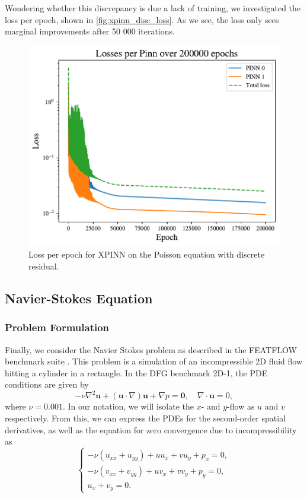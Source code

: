 Wondering whether this discrepancy is due a lack of training, we investigated the loss per epoch, shown in \autoref{fig:xpinn_disc_loss}.
As we see, the loss only sees marginal improvements after 50 000 iterations.

\begin{figure}
    \centering
    \includegraphics[width=0.9\linewidth]{Project1XPINNs/figures/Poisson/discrete_xpinn_Poisson_losses.pdf}
    \caption{Loss per epoch for XPINN on the Poisson equation with discrete residual.}
    \label{fig:xpinn_disc_loss}
\end{figure}

\subsection{Navier-Stokes Equation}
\subsubsection{Problem Formulation}
Finally, we consider the Navier Stokes problem as described in the FEATFLOW benchmark suite \cite{DFG}. This problem is a simulation of an incompressible 2D fluid flow hitting a cylinder in a rectangle. In the DFG benchmark 2D-1, the PDE conditions are given by
\begin{equation}
    -\nu \nabla^2 \mathbf{u} + (\mathbf{u} \cdot \nabla)\mathbf{u} + \nabla p = \mathbf{0}, \quad \nabla \cdot \mathbf{u} = 0,
\end{equation}
where $\nu = 0.001$. In our notation, we will isolate the $x$- and $y$-flow as $u$ and $v$ respectively. From this, we can express the PDEs for the second-order spatial derivatives, as well as the equation for zero convergence due to incompressibility as
\begin{equation}
\begin{cases}
-\nu(u_{xx} + u_{yy})+uu_x+vu_y+p_x = 0, \\
-\nu(v_{xx} + v_{yy})+uv_x+vv_y+p_y = 0, \\
u_x + v_y = 0.
\end{cases}
\end{equation}

